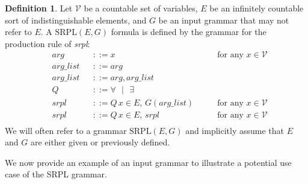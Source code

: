 \documentclass[12pt]{article}
\theoremstyle{definition}
\newtheorem{definition}{Definition}
\theoremstyle{remark}
\newcommand{\st}{\text{ }|\text{ }}
\newcommand{\SRPL}{\text{SRPL}}
\begin{document}
\begin{definition}
  Let $\mathcal{V}$ be a countable set of variables, $E$ be an infinitely countable sort of indistinguishable elements, and $G$ be an input grammar that may not refer to $E$.  A $\SRPL(E,G)$ formula is defined by the grammar for the production rule of \textit{srpl}:
  \begin{align*}
    &arg& &::= x \qquad &\text{for any } x \in \mathcal{V}\\
    &arg\_list& &::= arg\\
    &arg\_list& &::= arg,arg\_list\\
    &Q& &::= \forall \st \exists\\
    &srpl& &::= Q \, x \in E, \, G(arg\_list) \qquad &\text{for any } x \in \mathcal{V}\\
    &srpl& &::= Q \, x \in E, \, srpl \qquad &\text{for any } x \in \mathcal{V}\\
  \end{align*}
  We will often refer to a grammar $\SRPL(E,G)$ and implicitly assume that $E$ and $G$ are either given or previously defined.
\end{definition}

We now provide an example of an input grammar to illustrate a potential use case of the SRPL grammar.
\end{document}
